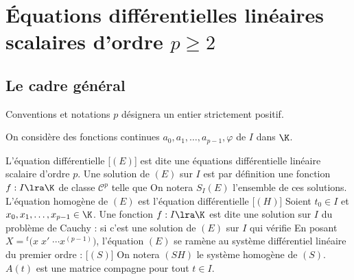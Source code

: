 

\section{Équations différentielles linéaires scalaires d'ordre $p\geq2$}

\subsection{Le cadre général}

\begin{genthm}{Conventions et notations}
$p$ désignera un entier strictement positif.

On considère des fonctions continues $a_0,a_1,\ldots,a_{p-1},\varphi$ de $I$ dans $\K$.

\unite L'équation différentielle
[$(E)$]
est dite une équations différentielle linéaire scalaire d'ordre $p$. Une solution de $(E)$ sur $I$ est par définition une fonction $f:I\lra \K$ de classe $\mathcal C^p$ telle que
On notera $S_I(E)$ l'ensemble de ces solutions.
\unite L'équation homogène de $(E)$ est l'équation différentielle
[$(H)$]
\unite Soient $t_0\in I$ et $x_0,x_1,\ldots,x_{p-1}\in\K$.
Une fonction $f:I\lra \K$ est dite une solution sur $I$ du  problème de Cauchy :
si c'est une solution de $(E)$ sur $I$ qui vérifie
\unite En posant $X={}^t\big(x\; x'\;\cdots x^{(p-1)}\big)$, l'équation $(E)$ se ramène au système différentiel linéaire du premier ordre :
[$(S)$]
On notera $(SH)$ le système homogène de $(S)$.
\nb $A(t)$ est une matrice compagne pour tout $t\in I$.\endnb
\end{genthm}

